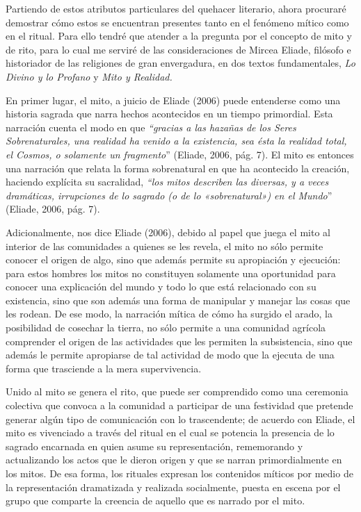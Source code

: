 \begin{refsection}
Partiendo de estos atributos particulares del quehacer literario, ahora procuraré demostrar cómo estos se encuentran presentes tanto en el fenómeno mítico como en el ritual. Para ello tendré que atender a la pregunta por el concepto de mito y de rito, para lo cual me serviré de las consideraciones de Mircea Eliade, filósofo e historiador de las religiones de gran envergadura, en dos textos fundamentales, \emph{Lo Divino y lo Profano} y \emph{Mito y Realidad. }

En primer lugar, el mito, a juicio de Eliade (2006) puede entenderse como una historia sagrada que narra hechos acontecidos en un tiempo primordial. Esta narración cuenta el modo en que \emph{``gracias a las hazañas de los Seres Sobrenaturales, una realidad ha venido a la existencia, sea ésta la realidad total, el Cosmos, o solamente un fragmento}'' (Eliade, 2006, pág. 7). El mito es entonces una narración que relata la forma sobrenatural en que ha acontecido la creación, haciendo explícita su sacralidad, \emph{``los mitos describen las diversas, y a veces dramáticas, irrupciones de lo sagrado (o de lo «sobrenatural») en el Mundo}'' (Eliade, 2006, pág. 7).

Adicionalmente, nos dice Eliade (2006), debido al papel que juega el mito al interior de las comunidades a quienes se les revela, el mito no sólo permite conocer el origen de algo, sino que además permite su apropiación y ejecución: para estos hombres los mitos no constituyen solamente una oportunidad para conocer una explicación del mundo y todo lo que está relacionado con su existencia, sino que son además una forma de manipular y manejar las cosas que les rodean. De ese modo, la narración mítica de cómo ha surgido el arado, la posibilidad de cosechar la tierra, no sólo permite a una comunidad agrícola comprender el origen de las actividades que les permiten la subsistencia, sino que además le permite apropiarse de tal actividad de modo que la ejecuta de una forma que trasciende a la mera supervivencia.

Unido al mito se genera el rito, que puede ser comprendido como una ceremonia colectiva que convoca a la comunidad a participar de una festividad que pretende generar algún tipo de comunicación con lo trascendente; de acuerdo con Eliade, el mito es vivenciado a través del ritual en el cual se potencia la presencia de lo sagrado encarnada en quien asume su representación, rememorando y actualizando los actos que le dieron origen y que se narran primordialmente en los mitos. De esa forma, los rituales expresan los contenidos míticos por medio de la representación dramatizada y realizada socialmente, puesta en escena por el grupo que comparte la creencia de aquello que es narrado por el mito.


\end{refsection}
